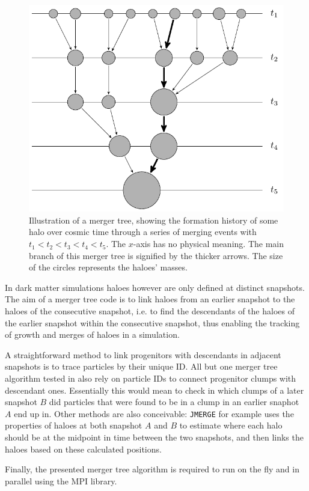 \begin{figure}[H]
    \centering
    \includegraphics[width=.5\textwidth]{./images/tikz/mergertree.pdf}
    \caption{Illustration of a merger tree, showing the formation history of some halo over cosmic time through a series of merging events with $t_1 < t_2 < t_3 < t_4 < t_5$. 
        The $x$-axis has no physical meaning.
        The main branch of this merger tree is signified by the thicker arrows.
        The size of the circles represents the haloes' masses.}
    \label{fig:mergertree_scheme}
\end{figure}


In dark matter simulations haloes however are only defined at distinct snapshots.
The aim of a merger tree code is to link haloes from an earlier snapshot to the haloes of the consecutive snapshot, i.e. to find the descendants of the haloes of the earlier snapshot within the consecutive snapshot, thus enabling the tracking of growth and merges of haloes in a simulation.

A straightforward method to link progenitors with descendants in adjacent snapshots is to trace particles by their unique ID.
All but one merger tree algorithm tested in \cite{SUSSING_COMPARISON} also rely on particle IDs to connect progenitor clumps with descendant ones.
Essentially this would mean to check in which clumps of a later snapshot $B$ did particles that were found to be in a clump in an earlier snaphot $A$ end up in.
Other methods are also conceivable: \texttt{JMERGE} \parencite{SUSSING_COMPARISON} for example uses the properties of haloes at both snapshot $A$ and $B$ to estimate where each halo should be at the midpoint in time between the two snapshots, and then links the haloes based on these calculated positions.

Finally, the presented merger tree algorithm is required to run on the fly and in parallel using the MPI library.










